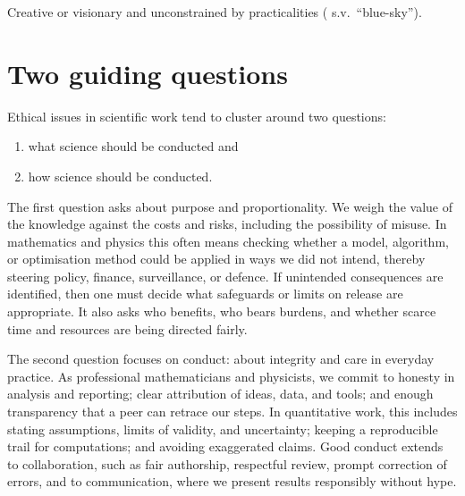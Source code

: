 \documentclass[
  a4paper,
  DIV=11,
  numbers=noendperiod,
  oneside]{scrreprt}
\providecommand{\tightlist}{%
  \setlength{\itemsep}{0pt}\setlength{\parskip}{0pt}}
\begin{document}
\begin{tcolorbox}[enhanced jigsaw, opacitybacktitle=0.6, colframe=quarto-callout-note-color-frame, bottomrule=.15mm, coltitle=black, colback=white, title={blue-sky}, breakable, toptitle=1mm, arc=.35mm, left=2mm, opacityback=0, rightrule=.15mm, bottomtitle=1mm, colbacktitle=quarto-callout-note-color!10!white, toprule=.15mm, leftrule=.75mm, titlerule=0mm]

Creative or visionary and unconstrained by practicalities
(
s.v.~``blue-sky'').

\end{tcolorbox}

\section{Two guiding questions}\label{two-guiding-questions}

Ethical issues in scientific work tend to cluster around two questions:

\begin{enumerate}
\def\labelenumi{\arabic{enumi}.}
\tightlist
\item
  what science should be conducted and
\item
  how science should be conducted.
\end{enumerate}

The first question asks about purpose and proportionality. We weigh the
value of the knowledge against the costs and risks, including the
possibility of misuse. In mathematics and physics this often means
checking whether a model, algorithm, or optimisation method could be
applied in ways we did not intend, thereby steering policy, finance,
surveillance, or defence. If unintended consequences are identified,
then one must decide what safeguards or limits on release are
appropriate. It also asks who benefits, who bears burdens, and whether
scarce time and resources are being directed fairly.

The second question focuses on conduct: about integrity and care in
everyday practice. As professional mathematicians and physicists, we
commit to honesty in analysis and reporting; clear attribution of ideas,
data, and tools; and enough transparency that a peer can retrace our
steps. In quantitative work, this includes stating assumptions, limits
of validity, and uncertainty; keeping a reproducible trail for
computations; and avoiding exaggerated claims. Good conduct extends to
collaboration, such as fair authorship, respectful review, prompt
correction of errors, and to communication, where we present results
responsibly without hype.
\end{document}
